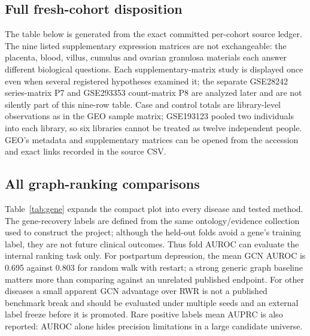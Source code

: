 \documentclass[11pt,a4paper]{article}
\begin{document}
\subsection{Full fresh-cohort disposition}
The table below is generated from the exact committed per-cohort source ledger. The nine listed supplementary expression matrices are not exchangeable: the placenta, blood, villus, cumulus and ovarian granulosa materials each answer different biological questions. Each supplementary-matrix study is displayed once even when several registered hypotheses examined it; the separate GSE28242 series-matrix P7 and GSE293353 count-matrix P8 are analyzed later and are not silently part of this nine-row table. Case and control totals are library-level observations as in the GEO sample matrix; GSE193123 pooled two individuals into each library, so six libraries cannot be treated as twelve independent people. GEO's metadata and supplementary matrices can be opened from the accession and exact links recorded in the source CSV.


\subsection{All graph-ranking comparisons}
Table~\ref{tab:gene} expands the compact plot into every disease and tested method. The gene-recovery labels are defined from the same ontology/evidence collection used to construct the project; although the held-out folds avoid a gene's training label, they are not future clinical outcomes. Thus fold AUROC can evaluate the internal ranking task only. For postpartum depression, the mean GCN AUROC is 0.695 against 0.803 for random walk with restart; a strong generic graph baseline matters more than comparing against an unrelated published endpoint. For other diseases a small apparent GCN advantage over RWR is not a published benchmark break and should be evaluated under multiple seeds and an external label freeze before it is promoted. Rare positive labels mean AUPRC is also reported: AUROC alone hides precision limitations in a large candidate universe.

\end{document}
